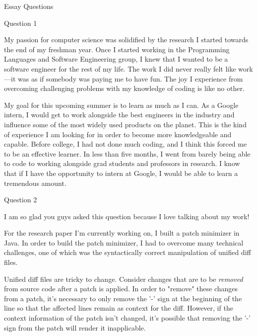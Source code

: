 \documentclass{resume} %
\begin{document}
\begin{rSection}{Essay Questions}
  \begin{rSubsection}{Question 1}{}{}{}
    \item My passion for computer science was solidified by the research I started towards the
    end of my freshman year. Once I started working in the Programming Languages and
    Software Engineering group, I knew that I wanted to be a software engineer
    for the rest of my life. The work I did never really felt like work---it was as if somebody
    was paying me to have fun. The joy I experience from overcoming challenging problems
    with my knowledge of coding is like no other.

    My goal for this upcoming summer is to learn as much as I can. As a Google intern,
    I would get to work alongside the best
    engineers in the industry and influence some of the most widely used products on the
    planet. This is the kind of experience I am looking for in order to become more
    knowledgeable and capable. Before college, I had not done much coding, and I think this forced
    me to be an effective learner. In less than
    five months, I went from barely being able to code to working alongside grad
    students and professors in research. I know that if I have the opportunity to intern
    at Google, I would be able to learn a tremendous amount.
  \end{rSubsection}

   \begin{rSubsection}{Question 2}{}{}{}
    \item I am so glad you guys asked this question because I love talking about my work!

    For the research paper I'm currently working on, I built a patch minimizer in Java.
    In order to build the patch minimizer, I had to overcome many technical challenges,
    one of which was the syntactically correct manipulation of unified diff files.

    Unified diff files are tricky to change. Consider changes that are to be \textit{removed}
    from source code after a patch is applied. In order to "remove" these changes from a patch, it's necessary 
    to only remove the '-' sign at the beginning of the line so that the affected lines remain
    as context for the diff. However,
    if the context information of the patch isn't changed, it's possible that removing the
    '-' sign from the patch will render it inapplicable.


\end{rSubsection}
\end{rSection}
\end{document}
